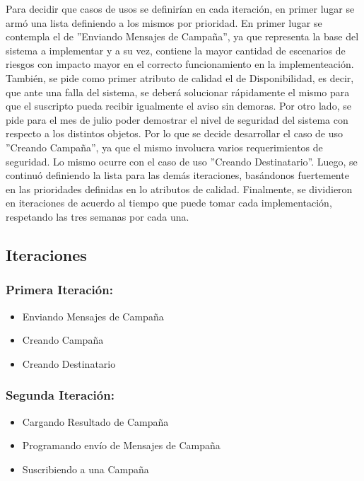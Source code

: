 \documentclass[a4paper, 11pt]{article}
\begin{document}
Para decidir que casos de usos se definirían en cada iteración, en primer lugar se armó una lista definiendo a los mismos por prioridad. En primer lugar se contempla el de ''Enviando Mensajes de Campaña'', ya que representa la base del sistema a implementar y a su vez, contiene la mayor cantidad de escenarios de riesgos con impacto mayor en el correcto funcionamiento en la implementeación. También, se pide como primer atributo de calidad el de Disponibilidad, es decir, que ante una falla del sistema, se deberá solucionar rápidamente el mismo para que el suscripto pueda recibir igualmente el aviso sin demoras. 
Por otro lado, se pide para el mes de julio poder demostrar el nivel de seguridad del sistema con respecto a los distintos objetos. Por lo que se decide desarrollar el caso de uso ''Creando Campaña'', ya que el mismo involucra varios requerimientos de seguridad. Lo mismo ocurre con el caso de uso ''Creando Destinatario''.
Luego, se continuó definiendo la lista para las demás iteraciones, basándonos fuertemente en las prioridades definidas en lo atributos de calidad. Finalmente, se dividieron en iteraciones de acuerdo al tiempo que puede tomar cada implementación, respetando las tres semanas por cada una. 



\subsection{Iteraciones}
\subsubsection{Primera Iteraci\'on:}
\begin{itemize}
\item Enviando Mensajes de Campaña
\item Creando Campaña
\item Creando Destinatario
\end{itemize}

\subsubsection{Segunda Iteraci\'on:}
\begin{itemize}
\item Cargando Resultado de Campaña
\item Programando envío de Mensajes de Campaña
\item Suscribiendo a una Campaña
\end{itemize}
\end{document}
